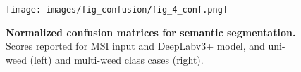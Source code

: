 


\begin{figure}
    \centering
    {\texttt{[image: images/fig\_confusion/fig\_4\_conf.png]}}
    \caption {\textbf{Normalized confusion matrices for semantic segmentation.} Scores reported for  MSI input and DeepLabv3+ model, and uni-weed (left) and multi-weed class cases (right).}
    \label{fig:confusion_matrix}
\end{figure}





